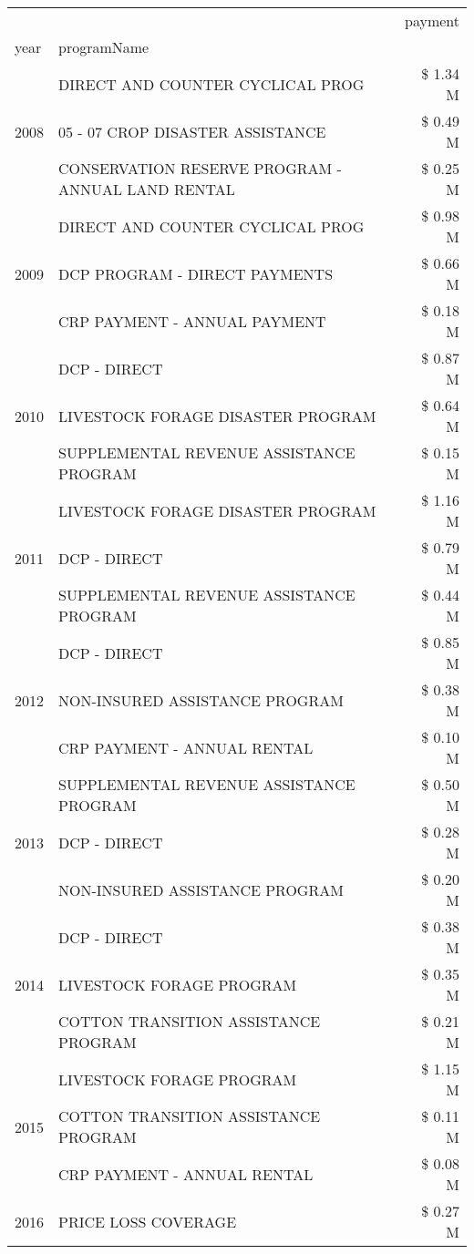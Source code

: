 \begin{tabular}{llr}
\toprule
 &  & payment \\
year & programName &  \\
\midrule
\multirow[t]{3}{*}{2008} & DIRECT AND COUNTER CYCLICAL PROG & \$ 1.34 M \\
 & 05 - 07 CROP DISASTER ASSISTANCE & \$ 0.49 M \\
 & CONSERVATION RESERVE PROGRAM - ANNUAL LAND RENTAL & \$ 0.25 M \\
\cline{1-3}
\multirow[t]{3}{*}{2009} & DIRECT AND COUNTER CYCLICAL PROG & \$ 0.98 M \\
 & DCP PROGRAM - DIRECT PAYMENTS & \$ 0.66 M \\
 & CRP PAYMENT - ANNUAL PAYMENT & \$ 0.18 M \\
\cline{1-3}
\multirow[t]{3}{*}{2010} & DCP - DIRECT & \$ 0.87 M \\
 & LIVESTOCK FORAGE DISASTER PROGRAM & \$ 0.64 M \\
 & SUPPLEMENTAL REVENUE ASSISTANCE PROGRAM & \$ 0.15 M \\
\cline{1-3}
\multirow[t]{3}{*}{2011} & LIVESTOCK FORAGE DISASTER PROGRAM & \$ 1.16 M \\
 & DCP - DIRECT & \$ 0.79 M \\
 & SUPPLEMENTAL REVENUE ASSISTANCE PROGRAM & \$ 0.44 M \\
\cline{1-3}
\multirow[t]{3}{*}{2012} & DCP - DIRECT & \$ 0.85 M \\
 & NON-INSURED ASSISTANCE PROGRAM & \$ 0.38 M \\
 & CRP PAYMENT - ANNUAL RENTAL & \$ 0.10 M \\
\cline{1-3}
\multirow[t]{3}{*}{2013} & SUPPLEMENTAL REVENUE ASSISTANCE PROGRAM & \$ 0.50 M \\
 & DCP - DIRECT & \$ 0.28 M \\
 & NON-INSURED ASSISTANCE PROGRAM & \$ 0.20 M \\
\cline{1-3}
\multirow[t]{3}{*}{2014} & DCP - DIRECT & \$ 0.38 M \\
 & LIVESTOCK FORAGE PROGRAM & \$ 0.35 M \\
 & COTTON TRANSITION ASSISTANCE PROGRAM & \$ 0.21 M \\
\cline{1-3}
\multirow[t]{3}{*}{2015} & LIVESTOCK FORAGE PROGRAM & \$ 1.15 M \\
 & COTTON TRANSITION ASSISTANCE PROGRAM & \$ 0.11 M \\
 & CRP PAYMENT - ANNUAL RENTAL & \$ 0.08 M \\
\cline{1-3}
\multirow[t]{3}{*}{2016} & PRICE LOSS COVERAGE & \$ 0.27 M \\

\end{tabular}
